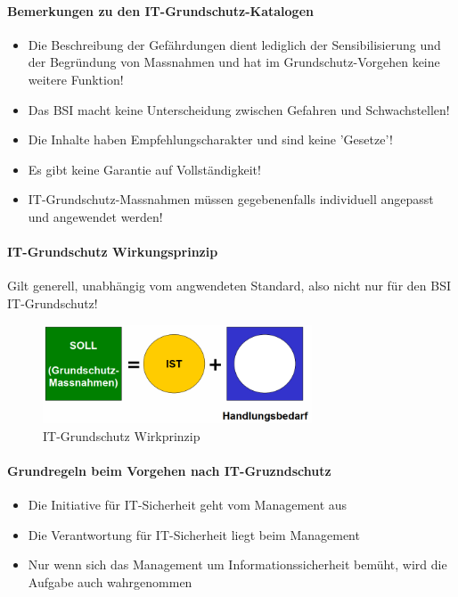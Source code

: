 \documentclass[10pt,a4paper]{article}
\begin{document}
\paragraph*{Bemerkungen zu den IT-Grundschutz-Katalogen}
\begin{itemize}[noitemsep,topsep=0pt,leftmargin=*]
    \item Die Beschreibung der Gefährdungen dient lediglich
    der Sensibilisierung und der Begründung von
    Massnahmen und hat im Grundschutz-Vorgehen keine
    weitere Funktion!
    \item Das BSI macht keine Unterscheidung zwischen
    Gefahren und Schwachstellen!
    \item Die Inhalte haben Empfehlungscharakter und sind
    keine 'Gesetze'!
    \item Es gibt keine Garantie auf Vollständigkeit!
    \item IT-Grundschutz-Massnahmen müssen gegebenenfalls
    individuell angepasst und angewendet werden!
\end{itemize}

\paragraph*{IT-Grundschutz Wirkungsprinzip} Gilt generell, unabhängig vom angwendeten Standard, also nicht nur für den BSI IT-Grundschutz!
\begin{figure}[H]
    \begin{center}
    \includegraphics[width=8cm]{images/Grundschutz_Wirkprinzip.png}
    \caption{IT-Grundschutz Wirkprinzip}
    \label{IT-Grundschutz Wirkprinzip}
    \end{center}
\end{figure}

\paragraph*{Grundregeln beim Vorgehen nach IT-Gruzndschutz}
\begin{itemize}[noitemsep,topsep=0pt,leftmargin=*]
    \item Die Initiative für IT-Sicherheit geht vom Management
    aus
    \item Die Verantwortung für IT-Sicherheit liegt beim
    Management
    \item Nur wenn sich das Management um
    Informationssicherheit bemüht, wird die Aufgabe auch
    wahrgenommen
\end{itemize}
\end{document}
